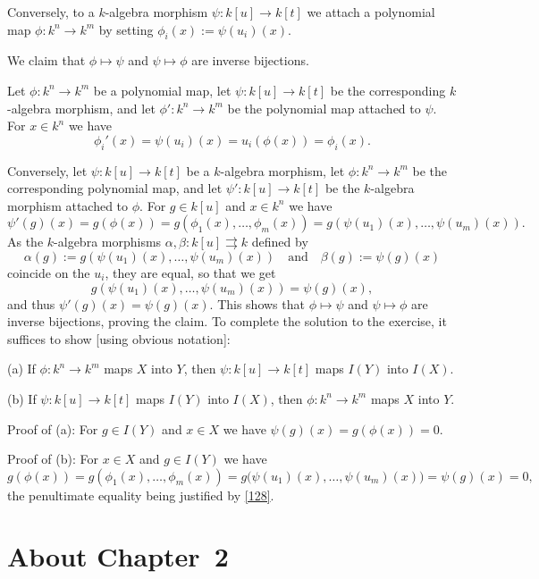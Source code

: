 \documentclass[12pt,letterpaper]{article}%
\newcommand{\nn}{\noindent}
\begin{document}
Conversely, to a $k$-algebra morphism $\psi:k[u]\to k[t]$ we attach a polynomial map $\phi:k^n\to k^m$ by setting $\phi_i(x):=\psi(u_i)(x)$. 

We claim that $\phi\mapsto\psi$ and $\psi\mapsto\phi$ are inverse bijections.

Let $\phi:k^n\to k^m$ be a polynomial map, let $\psi:k[u]\to k[t]$ be the corresponding $k$-algebra morphism, and let $\phi':k^n\to k^m$ be the polynomial map attached to $\psi$. For $x\in k^n$ we have 
$$
\phi_i'(x)=\psi(u_i)(x)=u_i(\phi(x))=\phi_i(x).
$$ 

Conversely, let $\psi:k[u]\to k[t]$ be a $k$-algebra morphism, let $\phi:k^n\to k^m$ be the corresponding polynomial map, and let $\psi':k[u]\to k[t]$ be the $k$-algebra morphism attached to $\phi$. For $g\in k[u]$ and $x\in k^n$ we have 
$$
\psi'(g)(x)=g(\phi(x))=g(\phi_1(x),\dots,\phi_m(x))=g(\psi(u_1)(x),\dots,\psi(u_m)(x)). 
$$ 
As the $k$-algebra morphisms $\alpha,\beta:k[u]\rightrightarrows k$ defined by 
$$
\alpha(g):=g(\psi(u_1)(x),\dots,\psi(u_m)(x))\quad\text{and}\quad\beta(g):=\psi(g)(x)
$$ 
coincide on the $u_i$, they are equal, so that we get 
\begin{equation}\label{128}
g(\psi(u_1)(x),\dots,\psi(u_m)(x))=\psi(g)(x),
\end{equation}
and thus $\psi'(g)(x)=\psi(g)(x)$. This shows that $\phi\mapsto\psi$ and $\psi\mapsto\phi$ are inverse bijections, proving the claim. To complete the solution to the exercise, it suffices to show [using obvious notation]:

\nn(a) If $\phi:k^n\to k^m$ maps $X$ into $Y$, then $\psi:k[u]\to k[t]$ maps $I(Y)$ into $I(X)$. 

\nn(b) If $\psi:k[u]\to k[t]$ maps $I(Y)$ into $I(X)$, then $\phi:k^n\to k^m$ maps $X$ into $Y$. 

\nn Proof of (a): For $g\in I(Y)$ and $x\in X$ we have $\psi(g)(x)=g(\phi(x))=0$. 

\nn Proof of (b): For $x\in X$ and $g\in I(Y)$ we have 
$$
g(\phi(x))=g(\phi_1(x),\dots,\phi_m(x))=g\big(\psi(u_1)(x),\dots,\psi(u_m)(x)\big)=\psi(g)(x)=0,
$$ 
the penultimate equality being justified by \eqref{128}.%

\newpage

\section{About Chapter~2}%
\end{document}
